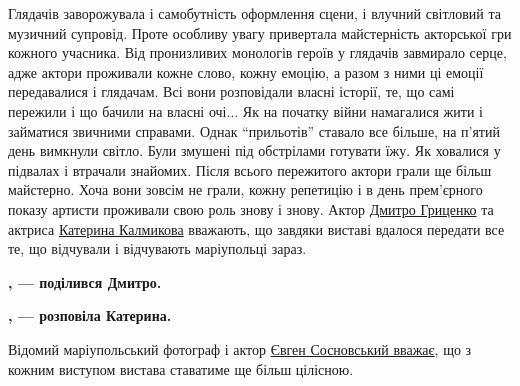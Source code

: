 
Глядачів заворожувала і самобутність оформлення сцени, і влучний світловий та
музичний супровід. Проте особливу увагу привертала майстерність акторської гри
кожного учасника. Від пронизливих монологів героїв у глядачів завмирало серце,
адже актори проживали кожне слово, кожну емоцію, а разом з ними ці емоції
передавалися і глядачам. Всі вони розповідали власні історії, те, що самі
пережили і що бачили на власні очі... Як на початку війни намагалися жити і
займатися звичними справами. Однак \enquote{прильотів} ставало все більше, на п'ятий
день вимкнули світло. Були змушені під обстрілами готувати їжу. Як ховалися у
підвалах і втрачали знайомих. Після всього пережитого актори грали ще більш
майстерно. Хоча вони зовсім не грали, кожну репетицію і в день прем'єрного
показу артисти проживали свою роль знову і знову. Актор \href{https://www.facebook.com/MrEvangelion}{Дмитро Гриценко} та
актриса \href{https://www.facebook.com/profile.php?id=100001570485517}{Катерина Калмикова} вважають, що завдяки виставі вдалося передати все
те, що відчували і відчувають маріупольці зараз.

\begin{leftbar}
	\begingroup
		\bfseries
{}, — поділився Дмитро.
	\endgroup
\end{leftbar}

\begin{leftbar}
	\begingroup
		\bfseries
{}, — розповіла Катерина.
	\endgroup
\end{leftbar}


Відомий маріупольський фотограф і актор \href{https://www.facebook.com/evgeny.sosnovsky}{Євген Сосновський вважає}, що з кожним
виступом вистава ставатиме ще більш цілісною. 

